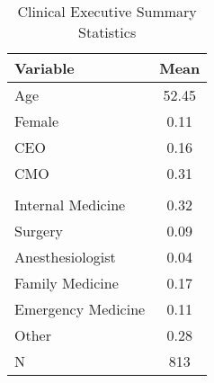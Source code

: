 \begin{table}[ht!]
\centering
\caption{\label{doc_sumstats}Clinical Executive Summary Statistics}
\centering
\begin{tabular}[t]{p{6cm} c}
\toprule
Variable & Mean\\
\midrule
Age & 52.45\\
Female & 0.11\\
CEO & 0.16\\
CMO & 0.31\\
\addlinespace[0.3em]
\multicolumn{2}{l}{\textbf{Specialty}}\\
\hspace{1em}Internal Medicine & 0.32\\
\hspace{1em}Surgery & 0.09\\
\hspace{1em}Anesthesiologist & 0.04\\
\hspace{1em}Family Medicine & 0.17\\
\hspace{1em}Emergency Medicine & 0.11\\
\hspace{1em}Other & 0.28\\
\addlinespace[0.3em]
N & 813\\
\bottomrule
\end{tabular}
\end{table}

